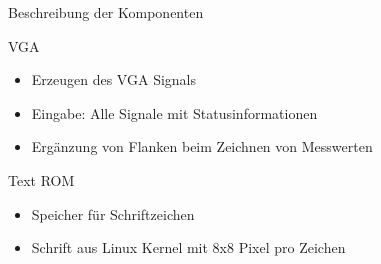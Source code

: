 \begin{frame}[<+->]{Beschreibung der Komponenten}
    \begin{block}{VGA}
        \begin{itemize}
            \item Erzeugen des VGA Signals
            \item Eingabe: Alle Signale mit Statusinformationen
            \item Ergänzung von Flanken beim Zeichnen von Messwerten
        \end{itemize}
    \end{block}
    \begin{block}{Text ROM}
        \begin{itemize}
            \item Speicher für Schriftzeichen
            \item Schrift aus Linux Kernel mit 8x8 Pixel pro Zeichen
        \end{itemize}
    \end{block}
\end{frame}
